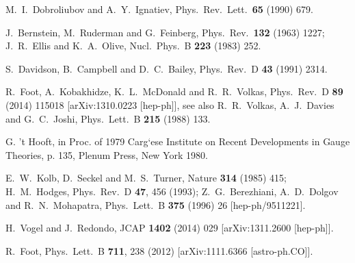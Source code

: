 \documentclass[12pt]{article}
\begin{document}
{{\begin{thebibliography}{999}
  M.~I.~Dobroliubov and A.~Y.~Ignatiev,
  Phys.\ Rev.\ Lett.\  {\bf 65} (1990) 679.
  
  J.~Bernstein, M.~Ruderman and G.~Feinberg,
  Phys.\ Rev.\  {\bf 132} (1963) 1227;
  J.~R.~Ellis and K.~A.~Olive,
  Nucl.\ Phys.\ B {\bf 223} (1983) 252.

  
  S.~Davidson, B.~Campbell and D.~C.~Bailey,
  Phys.\ Rev.\ D {\bf 43} (1991) 2314.
  
  R.~Foot, A.~Kobakhidze, K.~L.~McDonald and R.~R.~Volkas,
  Phys.\ Rev.\ D {\bf 89} (2014) 115018
  [arXiv:1310.0223 [hep-ph]],
  see also
  R.~R.~Volkas, A.~J.~Davies and G.~C.~Joshi,
  Phys.\ Lett.\ B {\bf 215} (1988) 133.

  G. 't Hooft, in Proc. of 1979 Carg`ese Institute on Recent Developments in Gauge Theories,
  p. 135, Plenum Press, New York 1980.
  
  E.~W.~Kolb, D.~Seckel and M.~S.~Turner,
  Nature {\bf 314} (1985) 415;
H.~M.~Hodges,
Phys.\ Rev.\ D {\bf 47}, 456 (1993);
 Z.~G.~Berezhiani, A.~D.~Dolgov and R.~N.~Mohapatra,
  Phys.\ Lett.\ B {\bf 375} (1996) 26
  [hep-ph/9511221].
  
  H.~Vogel and J.~Redondo,
  JCAP {\bf 1402} (2014) 029
  [arXiv:1311.2600 [hep-ph]].
  
  R.~Foot,
  Phys.\ Lett.\ B {\bf 711}, 238 (2012)
  [arXiv:1111.6366 [astro-ph.CO]].
  

\end{thebibliography}}}
\end{document}

